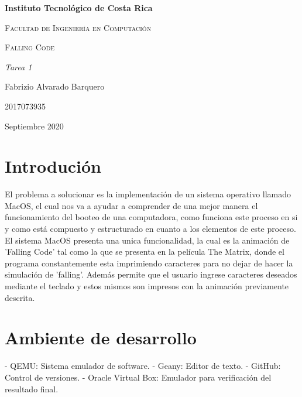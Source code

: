 \documentclass{report}
\begin{document}
\begin{titlepage}
\centering
{\bfseries\LARGE Instituto Tecnol\'ogico de Costa Rica \par}
\vspace{1cm}
{\scshape\Large Facultad de Ingenier\'ia en Computaci\'on \par}
\vspace{3cm}
{\scshape\Huge Falling Code\par}
\vspace{3cm}
{\itshape\Large Tarea 1\par}
\vfill
{\Large Fabrizio Alvarado Barquero\par}
{\Large 2017073935\par}
\vfill
{\Large Septiembre 2020 \par}
\end{titlepage}
\newpage
\section{Introduci\'on}
\newline
El problema a solucionar es la implementaci\'on de un sistema operativo llamado MacOS, el cual nos va a ayudar a comprender de una mejor manera el funcionamiento del booteo de una computadora, como funciona este proceso en si y como est\'a compuesto y estructurado en cuanto a los elementos de este proceso. \newline
\newline
El sistema MacOS presenta una unica funcionalidad, la cual es la animaci\'on de 'Falling Code' tal como la que se presenta en la pel\'icula The Matrix, donde el programa constantemente esta imprimiendo caracteres para no dejar de hacer la simulaci\'on de 'falling'. Adem\'as permite que el usuario ingrese caracteres deseados mediante el teclado y estos mismos son impresos con la animaci\'on previamente descrita.
\newpage
\section{Ambiente de desarrollo}
- QEMU: \newline Sistema emulador de software. \newline
\newline
- Geany: \newline Editor de texto. \newline
\newline
- GitHub: \newline Control de versiones. \newline
\newline
- Oracle Virtual Box: \newline Emulador para verificaci\'on del resultado final. \newline
\newline
\newpage
\end{document}
